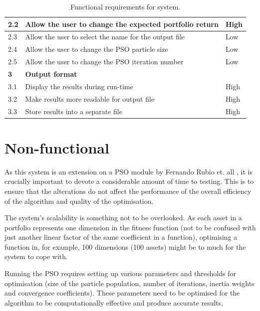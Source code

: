 \documentclass{pdfmx4020}
\begin{document}
\begin{table}[ht]
\begin{tabular}{|l|l|l|}
      \hline
      2.2 & Allow the user to change the expected portfolio return & High \\
      \hline 
      2.3 & Allow the user to select the name for the output file & Low \\
      \hline 
      2.4 & Allow the user to change the PSO particle size & Low \\
      \hline 
      2.5 & Allow the user to change the PSO iteration number & Low \\
      \hline
      \textbf{3} &\textbf{Output format} & \\
      \hline 
      3.1 & Display the results during run-time & High \\
      \hline 
      3.2 & Make results more readable for output file & High \\
      \hline
      3.3 & Store results into a separate file & High \\
      \hline
    \end{tabular}
    \caption{Functional requirements for system.}
    \label{table:functionalRequirements}
  \end{table}
  

  \section{Non-functional} %
  \label{sec:non_functional}
    As this system is an extension on a PSO module by Fernando Rubio et. all \cite{haskellPSO}, it is crucially important to devote a considerable amount of time to testing. This is to ensure that the alterations do not affect the performance of the overall efficiency of the algorithm and quality of the optimisation.  

    The system's scalability is something not to be overlooked. As each asset in a portfolio represents one dimension in the fitness function (not to be confused with just another linear factor of the same coefficient in a function), optimising a function in, for example, 100 dimensions (100 assets) might be to much for the system to cope with. 

    Running the PSO requires setting up various parameters and thresholds for optimisation (size of the particle population, number of iterations, inertia weights and convergence coefficients). These parameters need to be optimised for the algorithm to be computationally effective and produce accurate results. 
\end{document}
